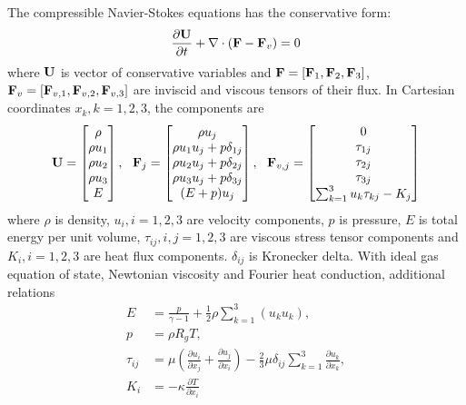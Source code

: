 The compressible Navier-Stokes equations has the conservative form:
\begin{equation}
    \label{eq:NS}
    \frac{\partial \mathbf{U}}{\partial t} +
    \mathbf\nabla \cdot (\mathbf{F} - \mathbf{F}_v)  = 0
\end{equation}
where $\mathbf{U}$ is vector of conservative variables and
$\mathbf{F}=[\mathbf{F}_1,\mathbf{F}_2,\mathbf{F}_3]$,
$\mathbf{F}_v=[\mathbf{F}_{v,1},\mathbf{F}_{v,2},\mathbf{F}_{v,3}]$
are
inviscid and viscous tensors of
their flux.
In Cartesian coordinates $x_k, k=1,2,3$, the components are
\begin{equation}
    \mathbf{U} = \begin{bmatrix}
        \rho \\ \rho u_1 \\ \rho u_2 \\ \rho u_3 \\ E
    \end{bmatrix},\ \
    \mathbf{F}_j = \begin{bmatrix}
        \rho u_j                   \\
        \rho u_1u_j + p\delta_{1j} \\
        \rho u_2u_j + p\delta_{2j} \\
        \rho u_3u_j + p\delta_{3j} \\
        (E+p)u_j                   \\
    \end{bmatrix},\ \
    \mathbf{F}_{v,j} = \begin{bmatrix}
        0                                \\
        \tau_{1j}                        \\
        \tau_{2j}                        \\
        \tau_{3j}                        \\
        \sum_{k=1}^3{u_k\tau_{kj}} - K_j \\
    \end{bmatrix}
\end{equation}
where $\rho$ is density,
$u_i, i=1,2,3$ are velocity components,
$p$ is pressure,
$E$ is total energy per unit volume,
$\tau_{ij}, i,j=1,2,3$ are viscous stress tensor components
and
$K_i, i=1,2,3$ are heat flux components.
$\delta_{ij}$ is
Kronecker delta.
With ideal gas equation of state,
Newtonian viscosity and Fourier
heat conduction, additional relations
\begin{equation}
    \begin{aligned}
        E         & = \frac{p}{\gamma -1 } + \frac{1}{2}\rho\sum_{k=1}^{3}(u_ku_k),  \\
        p         & =\rho R_g T                                              ,       \\
        \tau_{ij} & =
        \mu\left(\frac{\partial u_i}{\partial x_j} + \frac{\partial u_j}{\partial x_i}\right)
        -
        \frac{2}{3}\mu \delta_{ij}\sum_{k=1}^{3}{\frac{\partial u_k}{\partial x_k}}, \\
        K_i       & = - \kappa \frac{\partial T}{\partial x_i}
    \end{aligned}
\end{equation}
